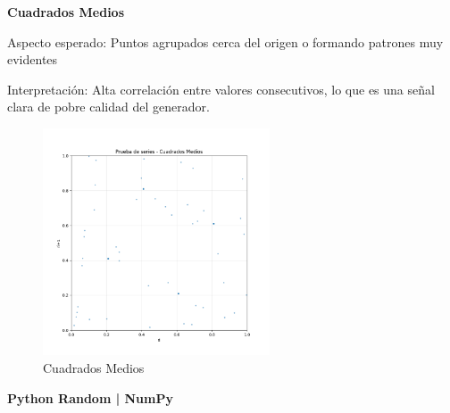 \documentclass{article}
\begin{document}
\textbf{Cuadrados Medios}

Aspecto esperado: Puntos agrupados cerca del origen o formando patrones muy evidentes

Interpretación: Alta correlación entre valores consecutivos, lo que es una señal clara de pobre calidad del generador.
\begin{figure}[H]
\centering
\includegraphics[width=0.6\textwidth]{Imagenes/series_Cuadrados Medios.png}
\caption{Cuadrados Medios}
\end{figure}
\textbf{Python Random | NumPy}
\end{document}

